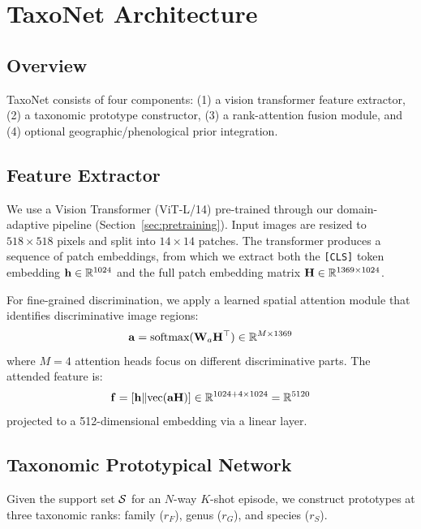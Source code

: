 \section{TaxoNet Architecture}

\label{sec:architecture}

\subsection{Overview}

TaxoNet consists of four components: (1) a vision transformer feature
extractor, (2) a taxonomic prototype constructor, (3) a rank-attention
fusion module, and (4) optional geographic/phenological prior
integration.

\subsection{Feature Extractor}

We use a Vision Transformer (ViT-L/14) pre-trained through our
domain-adaptive pipeline (Section~\ref{sec:pretraining}). Input images
are resized to $518 \times 518$ pixels and split into $14 \times 14$
patches. The transformer produces a sequence of patch embeddings, from
which we extract both the \texttt{[CLS]} token embedding $\mathbf{h}
\in \mathbb{R}^{1024}$ and the full patch embedding matrix $\mathbf{H} \in
\mathbb{R}^{1369 \times 1024}$.

For fine-grained discrimination, we apply a learned spatial attention
module that identifies discriminative image regions:
\begin{equation}
  \mathbf{a} = \text{softmax}(\mathbf{W}_a \mathbf{H}^\top) \in
  \mathbb{R}^{M \times 1369}
\end{equation}
where $M = 4$ attention heads focus on different discriminative parts.
The attended feature is:
\begin{equation}
  \mathbf{f} = [\mathbf{h} \| \text{vec}(\mathbf{a} \mathbf{H})]
  \in \mathbb{R}^{1024 + 4 \times 1024} = \mathbb{R}^{5120}
\end{equation}
projected to a 512-dimensional embedding via a linear layer.

\subsection{Taxonomic Prototypical Network}

Given the support set $\mathcal{S}$ for an $N$-way $K$-shot episode, we
construct prototypes at three taxonomic ranks: family ($r_F$), genus
($r_G$), and species ($r_S$).

